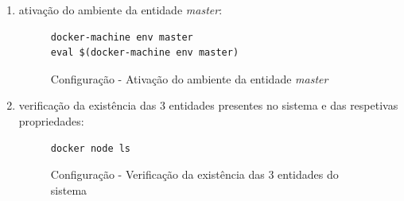 \documentclass[a4paper]{report}
\begin{document}
{\begin{enumerate}[label=\textbf{\arabic*.}]
            \begin{figure}[H]
                \centering
                \begin{verbatim}
docker-machine ssh worker1 sudo docker swarm join --token \
               SWMTKN-1-5zfy2iio54tma997pnt96gq5095fimqn2hxr2a8j16ogq0n3c9-0kp6mi5iuj956gpl9sfccd5bo\
               10.132.0.8:2377
                \end{verbatim}
                \vspace{-5mm}
                \caption{Configuração - \textit{swarm} \textsl{worker1}}
                \label{fig:5}
            \end{figure}

            \begin{figure}[H]
                \centering
                \begin{verbatim}
docker-machine ssh worker2 sudo docker swarm join --token \
               SWMTKN-1-5zfy2iio54tma997pnt96gq5095fimqn2hxr2a8j16ogq0n3c9-0kp6mi5iuj956gpl9sfccd5bo\
               10.132.0.8:2377
                \end{verbatim}
                \vspace{-5mm}
                \caption{Configuração - \textit{swarm} \textsl{worker2}}
                \label{fig:6}
            \end{figure}

            \item ativação do ambiente da entidade \textsl{master}:
            \begin{figure}[H]
                \centering
                \begin{verbatim}
docker-machine env master
eval $(docker-machine env master)
                \end{verbatim}
                \vspace{-5mm}
                \caption{Configuração - Ativação do ambiente da entidade \textsl{master}}
                \label{fig:7}
            \end{figure}

            \item verificação da existência das 3 entidades presentes no sistema e das respetivas propriedades:
            \begin{figure}[H]
                \centering
                \begin{verbatim}
docker node ls
                \end{verbatim}
                \vspace{-5mm}
                \caption{Configuração - Verificação da existência das 3 entidades do sistema}
                \label{fig:8}
            \end{figure}


\end{enumerate}}
\end{document}
